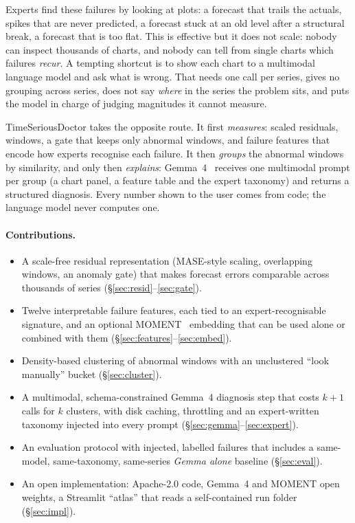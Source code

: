 \documentclass[10pt,twocolumn,a4paper]{article}
\begin{document}
Experts find these failures by looking at plots: a forecast that trails the actuals, spikes that are never predicted, a forecast stuck at an old level after a structural break, a forecast that is too flat. This is effective but it does not scale: nobody can inspect thousands of charts, and nobody can tell from single charts which failures \emph{recur}. A tempting shortcut is to show each chart to a multimodal language model and ask what is wrong. That needs one call per series, gives no grouping across series, does not say \emph{where} in the series the problem sits, and puts the model in charge of judging magnitudes it cannot measure.

TimeSeriousDoctor takes the opposite route. It first \emph{measures}: scaled residuals, windows, a gate that keeps only abnormal windows, and failure features that encode how experts recognise each failure. It then \emph{groups} the abnormal windows by similarity, and only then \emph{explains}: Gemma~4~\cite{gemma4} receives one multimodal prompt per group (a chart panel, a feature table and the expert taxonomy) and returns a structured diagnosis. Every number shown to the user comes from code; the language model never computes one.

\paragraph{Contributions.}
\begin{itemize}
  \item A scale-free residual representation (MASE-style scaling, overlapping windows, an anomaly gate) that makes forecast errors comparable across thousands of series (\S\ref{sec:resid}--\ref{sec:gate}).
  \item Twelve interpretable failure features, each tied to an expert-recognisable signature, and an optional MOMENT~\cite{goswami2024} embedding that can be used alone or combined with them (\S\ref{sec:features}--\ref{sec:embed}).
  \item Density-based clustering of abnormal windows with an unclustered ``look manually'' bucket (\S\ref{sec:cluster}).
  \item A multimodal, schema-constrained Gemma~4 diagnosis step that costs $k{+}1$ calls for $k$ clusters, with disk caching, throttling and an expert-written taxonomy injected into every prompt (\S\ref{sec:gemma}--\ref{sec:expert}).
  \item An evaluation protocol with injected, labelled failures that includes a same-model, same-taxonomy, same-series \emph{Gemma alone} baseline (\S\ref{sec:eval}).
  \item An open implementation: Apache-2.0 code, Gemma~4 and MOMENT open weights, a Streamlit ``atlas'' that reads a self-contained run folder (\S\ref{sec:impl}).
\end{itemize}
\end{document}
